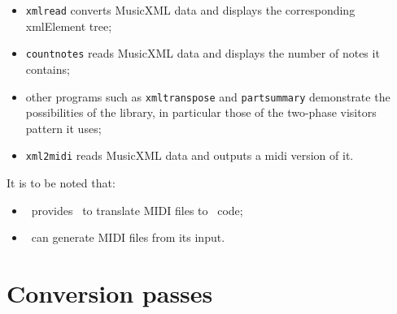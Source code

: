 \documentclass[12pt,a4paper]{article}
\begin{document}
\begin{itemize}
\item {\tt xmlread} converts MusicXML data and displays the corresponding xmlElement tree;
\item {\tt countnotes} reads MusicXML data and displays the number of notes it contains;
\item other programs such as {\tt xmltranspose} and {\tt partsummary} demonstrate the possibilities of the library, in particular those of the two-phase visitors pattern it uses;
\item {\tt xml2midi} reads MusicXML data and outputs a midi version of it.
\end{itemize}

It is to be noted that:
\begin{itemize}
\item \lily\ provides \midiToLy\ to translate MIDI files to \lily\ code;
\item \lily\ can generate MIDI files from its input.
\end{itemize} 


\section{Conversion passes}
\end{document}
